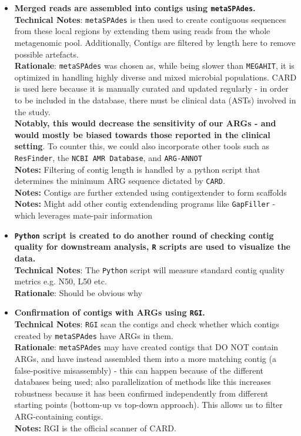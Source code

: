 \documentclass[11pt]{article}
\begin{document}
\begin{itemize}
	\item \textbf{Merged reads are assembled into contigs using \texttt{metaSPAdes}.}\\
	\textbf{Technical Notes}: \texttt{metaSPAdes} is then used to create contiguous sequences from these local regions by extending them using reads from the whole metagenomic pool. Additionally, Contigs are filtered by length here to remove possible artefacts. \\
	\textbf{Rationale}: \texttt{metaSPAdes} was chosen as, while being slower than \texttt{MEGAHIT}, it is optimized in handling highly diverse and mixed microbial populations. CARD is used here because it is manually curated and updated regularly - in order to be included in the database, there must be clinical data (ASTs) involved in the study.
\\	 \textbf{Notably, this would decrease the sensitivity of our ARGs - and would mostly be biased towards those reported in the clinical setting}. To counter this, we could also incorporate other tools such as \texttt{ResFinder}, the \texttt{NCBI AMR Database}, and \texttt{ARG-ANNOT}
\\	\textbf{Notes:} Filtering of contig length is handled by a python script that determines the minimum ARG sequence dictated by \texttt{CARD}.
\\	\textbf{Notes:} Contigs are further extended using contigextender to form scaffolds 
\\	\textbf{Notes:} Might add other contig extendending programs like \texttt{GapFiller} - which leverages mate-pair information 
	
	\item \textbf{\texttt{Python} script is created to do another round of checking contig quality for downstream analysis, \texttt{R} scripts are used to visualize the data.} \\
	\textbf{Technical Notes}: The \texttt{Python} script will measure standard contig quality metrics e.g. N50, L50 etc. \\
	\textbf{Rationale}: Should be obvious why
	
	\item \textbf{Confirmation of contigs with ARGs using \texttt{RGI}.}\\
	\textbf{Technical Notes}: \texttt{RGI} scan the contigs and check whether which contigs created by \texttt{metaSPAdes} have ARGs in them. \\
	\textbf{Rationale}: \texttt{metaSPAdes} may have created contigs that DO NOT contain ARGs, and have instead assembled them into a more matching contig (a false-positive misassembly) - this can happen because of the different databases being used; also parallelization of methods like this increases robustness because it has been confirmed independently from different starting points (bottom-up vs top-down approach). This allows us to filter ARG-containing contigs. \\
	\textbf{Notes:} RGI is the official scanner of CARD.
	

\end{itemize}
\end{document}
